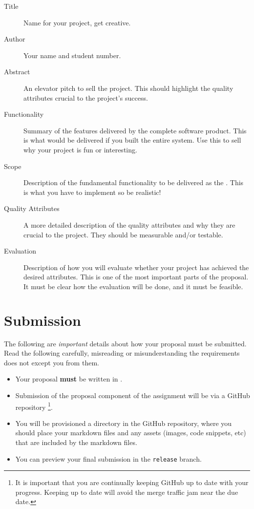 \documentclass{csse4400}
\begin{document}
\begin{description}
    \item[Title] Name for your project, get creative.
    \item[Author] Your name and student number.
    \item[Abstract] An elevator pitch to sell the project. This should highlight the quality attributes crucial to the project's success.
    \item[Functionality] Summary of the features delivered by the complete software product. This is what would be delivered if you built the entire system.
                                    Use this to sell why your project is fun or interesting.
    \item[Scope] Description of the fundamental functionality to be delivered as the .
                         This is what you have to implement so be realistic!
    \item[Quality Attributes] A more detailed description of the quality attributes and why they are crucial to the project.
                                            They should be measurable and/or testable.
    \item[Evaluation] Description of how you will evaluate whether your project has achieved the desired attributes.
                                This is one of the most important parts of the proposal.
                                It must be clear how the evaluation will be done, and it must be feasible.
\end{description}


\section{Submission}

The following are \emph{important} details about how your proposal must be submitted.
Read the following carefully, misreading or misunderstanding the requirements does not except you from them.

\begin{itemize}
    \item Your proposal \textbf{must} be written in .
    \item Submission of the proposal component of the assignment will be via a GitHub repository%
             \footnote{It is important that you are continually keeping GitHub up to date with your progress.
              Keeping up to date will avoid the merge traffic jam near the due date.}.
    \item You will be provisioned a directory in the GitHub repository,
             where you should place your markdown files and any assets (images, code snippets, etc) that are included by the markdown files.
    \item You can preview your final submission in the \texttt{release} branch.
\end{itemize}
\end{document}
